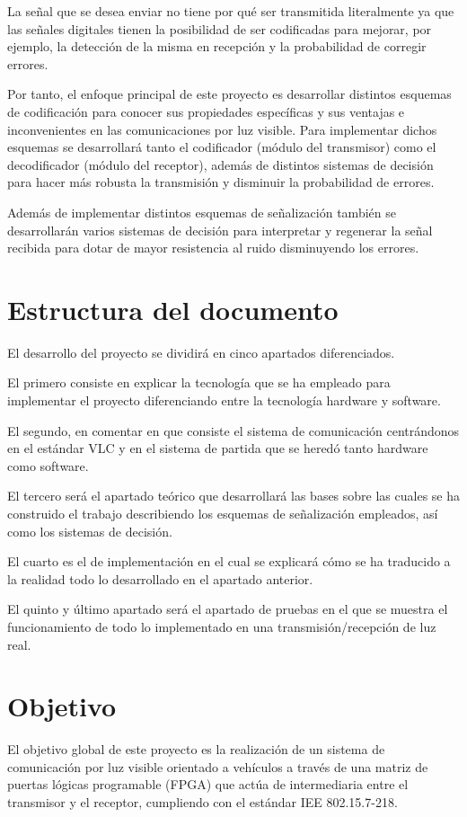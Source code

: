 La señal que se desea enviar no tiene por qué ser transmitida literalmente ya que las señales digitales tienen la posibilidad de 
ser codificadas para mejorar, por ejemplo, la detección de la misma en recepción y la probabilidad de corregir errores.

Por tanto, el enfoque principal de este proyecto es desarrollar distintos esquemas de codificación para conocer sus propiedades específicas y
sus ventajas e inconvenientes en las comunicaciones por luz visible. Para implementar dichos esquemas se desarrollará tanto el 
codificador (módulo del transmisor) como el decodificador (módulo del receptor), además de distintos sistemas de decisión para
hacer más robusta la transmisión y disminuir la probabilidad de errores.

Además de implementar distintos esquemas de señalización también se desarrollarán varios
sistemas de decisión para interpretar y regenerar la señal recibida para dotar de mayor
resistencia al ruido disminuyendo los errores.

\section{Estructura del documento}

El desarrollo del proyecto se dividirá en cinco apartados diferenciados.

El primero consiste en explicar la tecnología que se ha empleado para implementar el 
proyecto diferenciando entre la tecnología hardware y software.

El segundo, en comentar en que consiste el sistema de comunicación centrándonos en el 
estándar VLC y en el sistema de partida que se heredó tanto hardware como software.

El tercero será el apartado teórico que desarrollará las bases sobre las 
cuales se ha construido el trabajo describiendo los esquemas de señalización empleados,
así como los sistemas de decisión.

El cuarto es el de implementación en el cual se explicará cómo se ha traducido a la 
realidad todo lo desarrollado en el apartado anterior.

El quinto y último apartado será el apartado de pruebas en el que se muestra el 
funcionamiento de todo lo implementado en una transmisión/recepción de luz real.

\section{Objetivo}
\label{sec:intro:obj}
El objetivo global de este proyecto es la realización de un sistema de comunicación por luz
visible orientado a vehículos a través de una matriz de puertas lógicas programable
(FPGA) que actúa de intermediaria entre el transmisor y el receptor, cumpliendo con el
estándar IEE 802.15.7-218.

